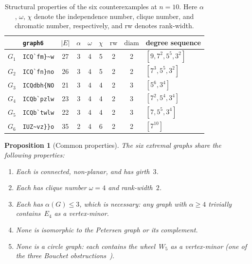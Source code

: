 \documentclass[11pt]{amsart}
\newtheorem{proposition}[theorem]{Proposition}
\theoremstyle{definition}
\theoremstyle{remark}
\begin{document}
\begin{table}[ht]
  \centering
  \caption{Structural properties of the six counterexamples at $n=10$.
    Here $\alpha$, $\omega$, $\chi$ denote the independence number,
    clique number, and chromatic number, respectively, and \textrm{rw}
    denotes rank-width.}
  \label{tab:structure}
  \begin{tabular}{clccccccl}
    \toprule
    & \texttt{graph6}
    & $|E|$ & $\alpha$ & $\omega$ & $\chi$ & $\mathrm{rw}$
    & $\mathrm{diam}$ & degree sequence \\
    \midrule
    $G_1$ & \verb|ICQ`fm}~w|
      & 27 & 3 & 4 & 5 & 2 & 2 & $[9,7^2,5^5,3^2]$ \\
    $G_2$ & \verb|ICQ`fn}no|
      & 26 & 3 & 4 & 5 & 2 & 2 & $[7^3,5^5,3^2]$ \\
    $G_3$ & \verb|ICQdbh{NO|
      & 21 & 3 & 4 & 4 & 2 & 3 & $[5^6,3^4]$ \\
    $G_4$ & \verb|ICQb`pzlw|
      & 23 & 3 & 4 & 4 & 2 & 3 & $[7^2,5^4,3^4]$ \\
    $G_5$ & \verb|ICQb`twlw|
      & 22 & 3 & 4 & 4 & 2 & 3 & $[7,5^5,3^4]$ \\
    $G_6$ & \verb|IUZ~vz}}o|
      & 35 & 2 & 4 & 6 & 2 & 2 & $[7^{10}]$ \\
    \bottomrule
  \end{tabular}
\end{table}

\begin{proposition}[Common properties]\label{prop:structure}
  The six extremal graphs share the following properties:
  \begin{enumerate}
    \item[\textup{(i)}]   Each is connected, non-planar, and has
                           girth~$3$.
    \item[\textup{(ii)}]  Each has clique number $\omega=4$ and
                           rank-width~$2$.
    \item[\textup{(iii)}] Each has $\alpha(G)\leq 3$, which is
                           necessary: any graph with $\alpha\geq 4$
                           trivially contains~$E_4$ as a vertex-minor.
    \item[\textup{(iv)}]  None is isomorphic to the Petersen graph or its
                           complement.
    \item[\textup{(v)}]   None is a circle graph: each contains the
                           wheel~$W_5$ as a vertex-minor
                           (one of the three Bouchet
                           obstructions~\cite{Bouchet1994}).
  \end{enumerate}
\end{proposition}
\end{document}

